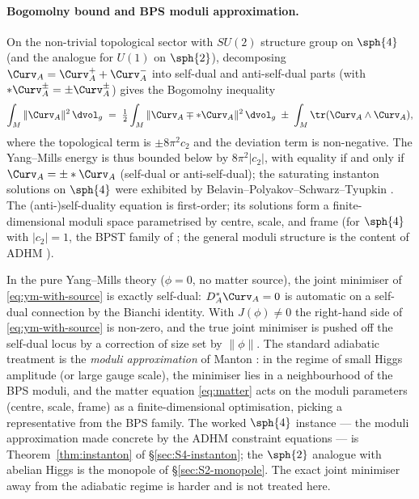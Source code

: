 \paragraph{Bogomolny bound and BPS moduli approximation.} On the
non-trivial topological sector with $SU(2)$ structure group on
$\sph{4}$ (and the analogue for $U(1)$ on $\sph{2}$), decomposing
$\Curv_A=\Curv_A^++\Curv_A^-$ into self-dual and anti-self-dual
parts (with $*\Curv_A^\pm=\pm\Curv_A^\pm$) gives the
Bogomolny inequality \cite{Bogomolny1976,JaffeTaubes}
\[
   \int_M\|\Curv_A\|^2\,\dvol_g
   \;=\; \tfrac{1}{2}\int_M\|\Curv_A\mp *\Curv_A\|^2\,\dvol_g
   \;\pm\;\int_M\tr(\Curv_A\wedge\Curv_A),
\]
where the topological term is $\pm 8\pi^2 c_2$ and the deviation term
is non-negative. The Yang--Mills energy is thus bounded below by
$8\pi^2|c_2|$, with equality if and only if $\Curv_A=\pm*\Curv_A$
(self-dual or anti-self-dual); the saturating instanton solutions
on $\sph{4}$ were exhibited by Belavin--Polyakov--Schwarz--Tyupkin
\cite{BPST1975}. The (anti-)self-duality equation is
first-order; its solutions form a finite-dimensional moduli space
parametrised by centre, scale, and frame (for $\sph{4}$ with
$|c_2|=1$, the BPST family of \cite{BPST1975}; the general
moduli structure is the content of ADHM \cite{ADHM1978,Atiyah1979}).

In the pure Yang--Mills theory ($\phi=0$, no matter source), the
joint minimiser of \eqref{eq:ym-with-source} is exactly self-dual:
$D_A^*\Curv_A=0$ is automatic on a self-dual connection by the
Bianchi identity. With $J(\phi)\neq 0$ the right-hand side of
\eqref{eq:ym-with-source} is non-zero, and the true joint minimiser
is pushed off the self-dual locus by a correction of size set by
$\|\phi\|$. The standard adiabatic treatment is the \emph{moduli
approximation} of Manton \cite{Manton1982}: in the regime of small
Higgs amplitude (or large
gauge scale), the minimiser lies in a neighbourhood of the BPS
moduli, and the matter equation \eqref{eq:matter} acts on the moduli
parameters (centre, scale, frame) as a finite-dimensional
optimisation, picking a representative from the BPS family. The
worked $\sph{4}$ instance --- the moduli approximation made
concrete by the ADHM constraint equations --- is
Theorem~\ref{thm:instanton} of \S\ref{sec:S4-instanton}; the
$\sph{2}$ analogue with abelian Higgs is the monopole of
\S\ref{sec:S2-monopole}. The exact joint minimiser away from the
adiabatic regime is harder and is not treated here.

